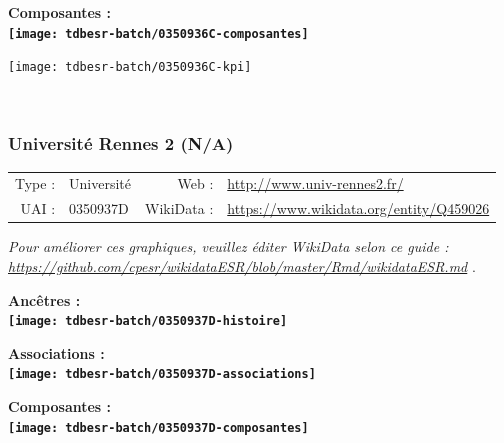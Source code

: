 \documentclass[12pt,french,]{article}
\begin{document}
\hrulefill

\begin{center} \bf Composantes : \\  
\texttt{[image: tdbesr-batch/0350936C-composantes]} \end{center}

\begin{center}\texttt{[image: tdbesr-batch/0350936C-kpi]} \end{center}\checkoddpage

\ifoddpage \fi ~\newpage  

\hypertarget{universituxe9-rennes-2-na}{%
\subsubsection{Université Rennes 2
(N/A)}\label{universituxe9-rennes-2-na}}

\begin{tabular*}{\textwidth}{rp{5cm}rl}  
\hline  
Type : & Université & Web : &\href{http://www.univ-rennes2.fr/}{http://www.univ-rennes2.fr/} \\  
UAI : & 0350937D & WikiData : & \href{https://www.wikidata.org/entity/Q459026}{https://www.wikidata.org/entity/Q459026} \\  
\hline  
\end{tabular*}

\textit{\scriptsize Pour améliorer ces graphiques, veuillez éditer WikiData selon ce guide :  \href{https://github.com/cpesr/wikidataESR/blob/master/Rmd/wikidataESR.md}{https://github.com/cpesr/wikidataESR/blob/master/Rmd/wikidataESR.md}}
.

\vspace{1cm}  
\begin{minipage}[b]{0.50\textwidth}\begin{center} \bf Ancêtres : \\  
\texttt{[image: tdbesr-batch/0350937D-histoire]} \end{center}\end{minipage}\begin{minipage}[b]{0.50\textwidth}\begin{center} \bf Associations : \\  
\texttt{[image: tdbesr-batch/0350937D-associations]} \end{center}\end{minipage}

\hrulefill

\begin{center} \bf Composantes : \\  
\texttt{[image: tdbesr-batch/0350937D-composantes]} \end{center}
\end{document}
